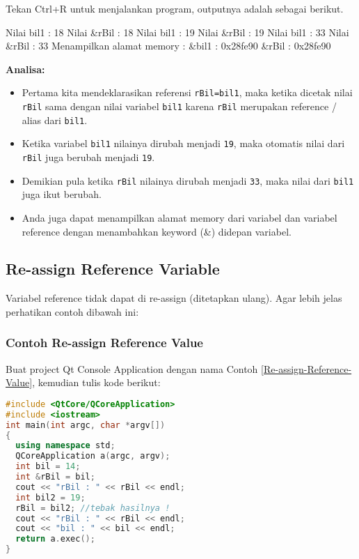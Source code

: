 Tekan Ctrl+R untuk menjalankan program, outputnya adalah sebagai
berikut.

\begin{lcverbatim}
Nilai bil1 : 18
Nilai &rBil : 18
Nilai bil1 : 19
Nilai &rBil : 19
Nilai bil1 : 33
Nilai &rBil : 33
Menampilkan alamat memory :
&bil1 : 0x28fe90
&rBil : 0x28fe90
\end{lcverbatim}

\textbf{Analisa:}

\begin{itemize}
\tightlist
\item
  Pertama kita mendeklarasikan referensi \texttt{rBil=bil1}, maka ketika
  dicetak nilai \texttt{rBil} sama dengan nilai variabel \texttt{bil1}
  karena \texttt{rBil} merupakan reference / alias dari \texttt{bil1}.
\item
  Ketika variabel \texttt{bil1} nilainya dirubah menjadi \texttt{19},
  maka otomatis nilai dari \texttt{rBil} juga berubah menjadi
  \texttt{19}.
\item
  Demikian pula ketika \texttt{rBil} nilainya dirubah menjadi
  \texttt{33}, maka nilai dari \texttt{bil1} juga ikut berubah.
\item
  Anda juga dapat menampilkan alamat memory dari variabel dan variabel
  reference dengan menambahkan keyword (\&) didepan variabel.
\end{itemize}

\subsection{Re-assign Reference
Variable}\label{re-assign-reference-variable}

Variabel reference tidak dapat di re-assign (ditetapkan ulang). Agar
lebih jelas perhatikan contoh dibawah ini:

\subsubsection*{Contoh  Re-assign Reference Value}

Buat project Qt Console Application dengan nama Contoh \ref{Re-assign-Reference-Value}, kemudian tulis
kode berikut:

\begin{lstlisting}[language=c++, caption=Re-assign Reference Value, label=Re-assign-Reference-Value]
#include <QtCore/QCoreApplication>
#include <iostream>
int main(int argc, char *argv[])
{
  using namespace std;
  QCoreApplication a(argc, argv);
  int bil = 14;
  int &rBil = bil;
  cout << "rBil : " << rBil << endl;
  int bil2 = 19;
  rBil = bil2; //tebak hasilnya !
  cout << "rBil : " << rBil << endl;
  cout << "bil : " << bil << endl;
  return a.exec();
}
\end{lstlisting}

